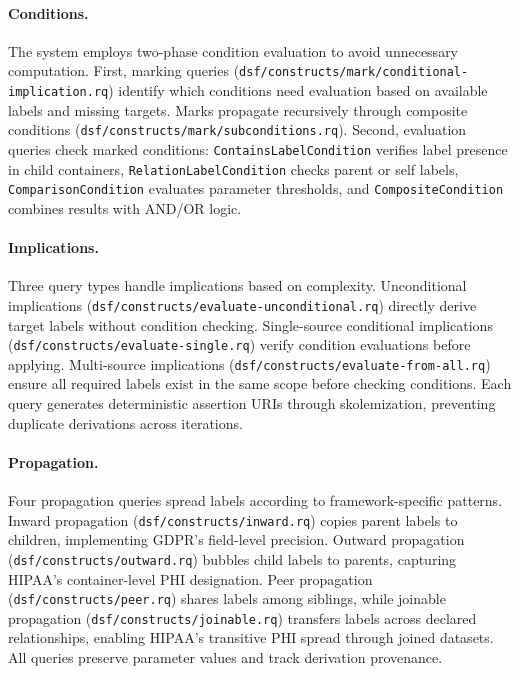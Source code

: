\documentclass{IOS-Book-Article}
\begin{document}
\paragraph{Conditions.}
The system employs two-phase condition evaluation to avoid unnecessary computation. First, marking queries (\texttt{dsf/constructs/mark/conditional-implication.rq}) identify which conditions need evaluation based on available labels and missing targets. Marks propagate recursively through composite conditions (\texttt{dsf/constructs/mark/subconditions.rq}). Second, evaluation queries check marked conditions: \texttt{ContainsLabelCondition} verifies label presence in child containers, \texttt{RelationLabelCondition} checks parent or self labels, \texttt{ComparisonCondition} evaluates parameter thresholds, and \texttt{CompositeCondition} combines results with AND/OR logic.

\paragraph{Implications.}
Three query types handle implications based on complexity. Unconditional implications (\texttt{dsf/constructs/evaluate-unconditional.rq}) directly derive target labels without condition checking. Single-source conditional implications (\texttt{dsf/constructs/evaluate-single.rq}) verify condition evaluations before applying. Multi-source implications (\texttt{dsf/constructs/evaluate-from-all.rq}) ensure all required labels exist in the same scope before checking conditions. Each query generates deterministic assertion URIs through skolemization, preventing duplicate derivations across iterations.

\paragraph{Propagation.}
Four propagation queries spread labels according to framework-specific patterns. Inward propagation (\texttt{dsf/constructs/inward.rq}) copies parent labels to children, implementing GDPR's field-level precision. Outward propagation (\texttt{dsf/constructs/outward.rq}) bubbles child labels to parents, capturing HIPAA's container-level PHI designation. Peer propagation (\texttt{dsf/constructs/peer.rq}) shares labels among siblings, while joinable propagation (\texttt{dsf/constructs/joinable.rq}) transfers labels across declared relationships, enabling HIPAA's transitive PHI spread through joined datasets. All queries preserve parameter values and track derivation provenance.
\end{document}

